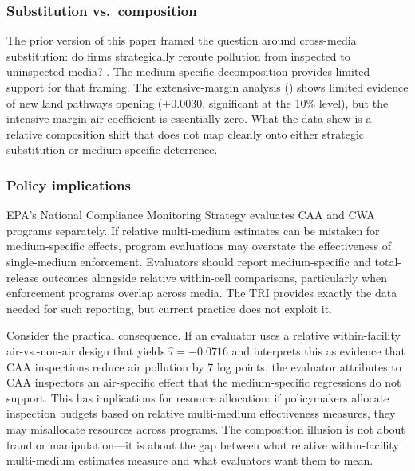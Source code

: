 \documentclass[12pt]{article}
\begin{document}
\subsubsection*{Substitution vs.\ composition} The prior version of this paper framed the question around cross-media substitution: do firms strategically reroute pollution from inspected to uninspected media? \citep{sigman1996crossmedia, sigman2001crossmedia}. The medium-specific decomposition provides limited support for that framing. The extensive-margin analysis () shows limited evidence of new land pathways opening ($+0.0030$, significant at the 10\% level), but the intensive-margin air coefficient is essentially zero. What the data show is a relative composition shift that does not map cleanly onto either strategic substitution or medium-specific deterrence.

\subsubsection*{Policy implications} EPA's National Compliance Monitoring Strategy evaluates CAA and CWA programs separately. If relative multi-medium estimates can be mistaken for medium-specific effects, program evaluations may overstate the effectiveness of single-medium enforcement. Evaluators should report medium-specific and total-release outcomes alongside relative within-cell comparisons, particularly when enforcement programs overlap across media. The TRI provides exactly the data needed for such reporting, but current practice does not exploit it.

Consider the practical consequence. If an evaluator uses a relative within-facility air-vs.-non-air design that yields $\hat{\tau} = -0.0716$ and interprets this as evidence that CAA inspections reduce air pollution by 7 log points, the evaluator attributes to CAA inspectors an air-specific effect that the medium-specific regressions do not support. This has implications for resource allocation: if policymakers allocate inspection budgets based on relative multi-medium effectiveness measures, they may misallocate resources across programs. The composition illusion is not about fraud or manipulation---it is about the gap between what relative within-facility multi-medium estimates measure and what evaluators want them to mean.
\end{document}
